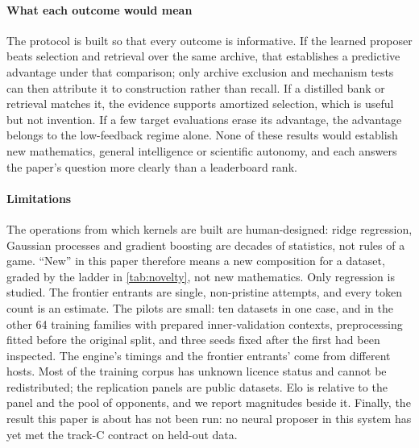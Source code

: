 \paragraph{What each outcome would mean} The protocol is built so that every outcome is
informative. If the learned proposer beats selection and retrieval over the same archive, that
establishes a predictive advantage under that comparison; only archive exclusion and mechanism tests
can then attribute it to construction rather than recall. If a distilled bank or retrieval matches
it, the evidence supports amortized selection, which is useful but not invention. If a few target
evaluations erase its advantage, the advantage belongs to the low-feedback regime alone. None of
these results would establish new mathematics, general intelligence or scientific autonomy, and
each answers the paper's question more clearly than a leaderboard rank.

\paragraph{Limitations} The operations from which kernels are built are human-designed: ridge
regression, Gaussian processes and gradient boosting are decades of statistics, not rules of a game.
``New'' in this paper therefore means a new composition for a dataset, graded by the ladder in
\cref{tab:novelty}, not new mathematics. Only regression is studied. The frontier entrants are single,
non-pristine attempts, and every token count is an estimate. The pilots are small: ten datasets in
one case, and in the other 64 training families with prepared inner-validation contexts, preprocessing
fitted before the original split, and three seeds fixed after the first had been inspected. The
engine's timings and the frontier entrants' come from different hosts. Most of the training corpus
has unknown licence status and cannot be redistributed; the replication panels are public datasets.
Elo is relative to the panel and the pool of opponents, and we report magnitudes beside it. Finally,
the result this paper is about has not been run: no neural proposer in this system has yet met the
track-C contract on held-out data.
